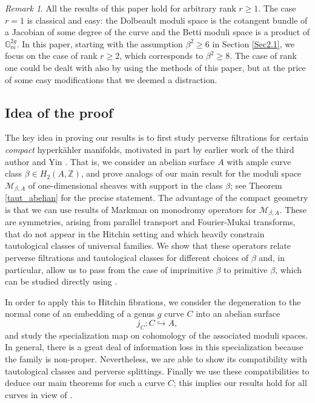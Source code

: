\documentclass[11pt]{amsart}
\theoremstyle{plain}
\theoremstyle{definition}
\theoremstyle{remark}
\newtheorem{rmk}[thm]{Remark}
\newcommand{\BZ}{{\mathbb{Z}}}
\newcommand{\CM}{{\mathcal M}}
\begin{document}
{
\begin{rmk}\label{r=1}
All the results of this paper hold for arbitrary rank $r \geq 1$. The case $r=1$ is classical and easy: the Dolbeault moduli space is the cotangent bundle of a Jacobian of some degree  of the curve and the Betti moduli space
is a product of $\mathbb G_m^{2g}$. In this paper, starting with the assumption {$\beta^2\geq 6$} in Section \ref{Sec2.1}, we focus on the case of rank $r\geq 2$, {which corresponds to $\beta^2 \geq 8$}. The case of rank one could be dealt with also by using the methods of this paper, but at the price of some easy modifications that we deemed a distraction. 
\end{rmk}
}
\subsection{Idea of the proof}

The key idea in proving our results
is to first study perverse filtrations for certain \emph{compact} hyperk\"ahler manifolds, motivated in part by earlier work of the third author and Yin \cite{SY}.
That is, we consider an abelian surface $A$ with ample curve class $\beta \in H_2(A, \BZ)$, and prove analogs of 
our main result for the moduli space
$\CM_{\beta,A}$ of one-dimensional sheaves with support in the class $\beta$; see Theorem \ref{taut_abelian} for the precise statement.
The advantage of the compact geometry is that we can use
results of Markman \cite{Markman3} on monodromy operators for $\CM_{\beta,A}$.  These are symmetries, arising from parallel transport and Fourier-Mukai transforms, that do not appear in the Hitchin setting and which heavily constrain tautological classes of universal families. We show that these operators relate perverse filtrations and tautological classes for different choices of $\beta$ and, in particular, allow us to pass from the case of imprimitive $\beta$ to primitive $\beta$, which can be studied directly using \cite{Z,SZ}.

In order to apply this to Hitchin fibrations, we consider the degeneration to the normal cone of an embedding
of {a genus $g$ curve $C$} into an abelian surface
\[
j_C: C\hookrightarrow A,
\]
and study the specialization map on cohomology of the associated moduli spaces.  In general, there is a great deal of information loss in this specialization because the family is non-proper. Nevertheless, we are able to show its compatibility with tautological classes and perverse splittings.  Finally we use these compatibilities  to deduce our main theorems {for such a curve $C$; this implies our results hold  for all curves in view of \cite{dCM}.}
\end{document}
